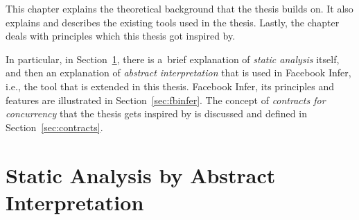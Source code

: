 This chapter explains the theoretical background that the thesis builds
on. It also explains and describes the existing tools used in the
thesis. Lastly, the chapter deals with principles which this thesis
got inspired by.

In particular, in Section~\ref{sec:statAnalysisAI}, there is a~brief 
explanation of \emph{static analysis} itself, and then an explanation of
\emph{abstract interpretation} that is used in Facebook Infer, i.e., the
tool that is extended in this thesis. Facebook Infer, its principles and
features are illustrated in Section~\ref{sec:fbinfer}. The concept of
\emph{contracts for concurrency} that the thesis gets inspired by is
discussed and defined in Section~\ref{sec:contracts}.


\section{Static Analysis by Abstract Interpretation}
\label{sec:statAnalysisAI}

